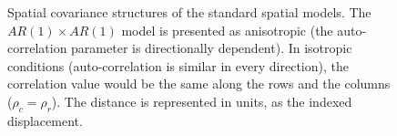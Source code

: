 \begin{figure}[hbtp]
	\caption[Spatial covariance structures of the standard spatial models]{Spatial covariance structures of the standard spatial models. The $AR(1)\times AR(1)$ model is presented as anisotropic (the auto-correlation parameter is directionally dependent). In isotropic conditions (auto-correlation is similar in every direction), the correlation value would be the same along the rows and the columns ($\rho_{c} = \rho_{r}$). The distance is represented in units, as the indexed displacement.}
	\label{fig:Spatial_cov_structure}
\end{figure}